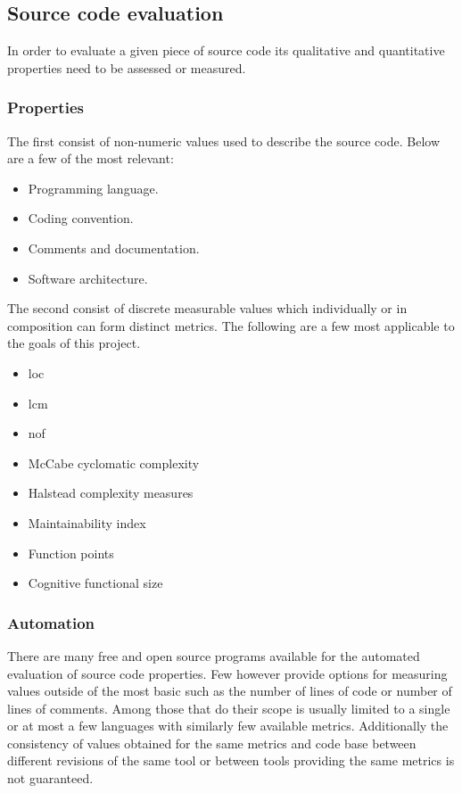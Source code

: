 \subsection{Source code evaluation}

In order to evaluate a given piece of source code its qualitative and quantitative properties need to be assessed or measured.

\subsubsection{Properties}

The first consist of non-numeric values used to describe the source code. Below are a few of the most relevant:

\begin{itemize}
    \item Programming language.
    \item Coding convention.
    \item Comments and documentation.
    \item Software architecture.
\end{itemize}

The second consist of discrete measurable values which individually or in composition can form distinct metrics. The following are a few most applicable to the goals of this project.

\begin{itemize}
    \item \gls{loc} \cite{loc}
    \item \gls{lcm} \cite{lcm-1,lcm-2}
    \item \gls{nof} \cite{nof}
    \item McCabe cyclomatic complexity \cite{mccabe-complexity}
    \item Halstead complexity measures \cite{halstead-complexity}
    \item Maintainability index \cite{maintainability-1,maintainability-2}
    \item Function points \cite{functional-size}
    \item Cognitive functional size \cite{cognitive-complexity}
\end{itemize}

\subsubsection{Automation}

There are many free and open source programs available for the automated evaluation of source code properties. Few however provide options for measuring values outside of the most basic such as the number of lines of code or number of lines of comments. Among those that do their scope is usually limited to a single or at most a few languages with similarly few available metrics. Additionally the consistency of values obtained for the same metrics and code base between different revisions of the same tool or between tools providing the same metrics is not guaranteed.

